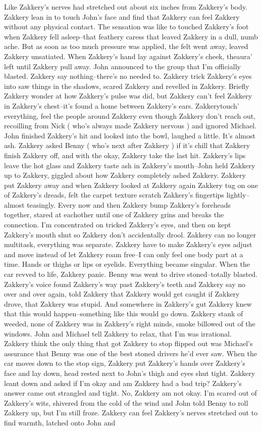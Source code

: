 \documentclass[12pt]{book}
\begin{document}
Like Zakkery's nerves had stretched out about six inches from Zakkery's body. Zakkery lean in to touch John's face and find that Zakkery can feel Zakkery without any physical contact. The sensation was like to touched Zakkery's foot when Zakkery fell asleep--that feathery caress that leaved Zakkery in a dull, numb ache. But as soon as too much pressure was applied, the felt went away, leaved Zakkery unsatiated. When Zakkery's hand lay against Zakkery's cheek, theaura' left until Zakkery pull away. John announced to the group that I'm officially blasted. Zakkery say nothing--there's no needed to. Zakkery trick Zakkery's eyes into saw things in the shadows, scared Zakkery and revelled in Zakkery. Briefly Zakkery wonder at how Zakkery's pulse was did, but Zakkery can't feel Zakkery in Zakkery's chest--it's found a home between Zakkery's ears. Zakkerytouch' everything, feel the people around Zakkery even though Zakkery don't reach out, recoilling from Nick ( who's always made Zakkery nervous ) and ignored Michael. John finished Zakkery's hit and looked into the bowl, laughed a little. It's almost ash. Zakkery asked Benny ( who's next after Zakkery ) if it's chill that Zakkery finish Zakkery off, and with the okay, Zakkery take the last hit. Zakkery's lips leave the hot glass and Zakkery taste ash in Zakkery's mouth--John held Zakkery up to Zakkery, giggled about how Zakkery completely ashed Zakkery. Zakkery put Zakkery away and when Zakkery looked at Zakkery again Zakkery tug on one of Zakkery's dreads, felt the carpet texture scratch Zakkery's fingertips lightly--almost teasingly. Every now and then Zakkery bump Zakkery's foreheads together, stared at eachother until one of Zakkery grins and breaks the connection. I'm concentrated on tricked Zakkery's eyes, and then on kept Zakkery's mouth shut so Zakkery don't accidentally drool. Zakkery can no longer multitask, everything was separate. Zakkery have to make Zakkery's eyes adjust and move instead of let Zakkery roam free--I can only feel one body part at a time. Hands or thighs or lips or eyelids. Everything became singular. When the car revved to life, Zakkery panic. Benny was went to drive stoned--totally blasted. Zakkery's voice found Zakkery's way past Zakkery's teeth and Zakkery say no over and over again, told Zakkery that Zakkery would get caught if Zakkery drove, that Zakkery was stupid. And somewhere in Zakkery's gut Zakkery knew that this would happen--something like this would go down. Zakkery stank of weeded, none of Zakkery was in Zakkery's right minds, smoke billowed out of the windows. John and Michael tell Zakkery to relax, that I'm was irrational. Zakkery think the only thing that got Zakkery to stop flipped out was Michael's assurance that Benny was one of the best stoned drivers he'd ever saw. When the car moves down to the stop sign, Zakkery put Zakkery's hands over Zakkery's face and lay down, head rested next to John's thigh and eyes shut tight. Zakkery leant down and asked if I'm okay and am Zakkery had a bad trip? Zakkery's answer came out strangled and tight. No, Zakkery am not okay. I'm scared out of Zakkery's wits, shivered from the cold of the wind and John told Benny to roll Zakkery up, but I'm still froze. Zakkery can feel Zakkery's nerves stretched out to find warmth, latched onto John and 
\end{document}
